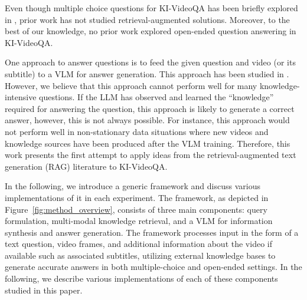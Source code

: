 

Even though multiple choice questions for KI-VideoQA has been briefly explored in \citet{garcia2020knowit}, prior work has not studied retrieval-augmented solutions. Moreover, to the best of our knowledge, no prior work explored open-ended question answering in KI-VideoQA. 





One approach to answer questions is to feed the given question and video (or its subtitle) to a VLM for answer generation. This approach has been studied in \cite{garcia2020knowit,wu2021transferring}. However, we believe that this approach cannot perform well for many knowledge-intensive questions. If the LLM has observed and learned the ``knowledge'' required for answering the question, this approach is likely to generate a correct answer, however, this is not always possible. For instance, this approach would not perform well in non-stationary data situations where new videos and knowledge sources have been produced after the VLM training. Therefore, this work presents the first attempt to apply ideas from the retrieval-augmented text generation (RAG) literature \cite{reml,rag} to KI-VideoQA.

In the following, we introduce a generic framework and discuss various implementations of it in each experiment. The framework, as depicted in Figure~\ref{fig:method_overview}, consists of three main components: query formulation, multi-modal knowledge retrieval, and a VLM for information synthesis and answer generation. The framework processes input in the form of a text question, video frames, and additional information about the video if available such as associated subtitles, utilizing external knowledge bases to generate accurate answers in both multiple-choice and open-ended settings. In the following, we describe various implementations of each of these components studied in this paper.


